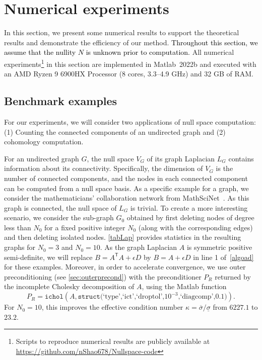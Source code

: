 \documentclass{siamart190516}
\newcommand{\Ttran}{\mathsf{T}}
\newcommand{\edit}[1]{\textcolor{black}{#1}} %
\begin{document}
\section{Numerical experiments}
\label{Sec:NumExp}



In this section, we present some numerical results to support the theoretical results and demonstrate the efficiency of our method. 
\edit{Throughout this section, we assume that the nullity $N$ is unknown prior to computation.}
All numerical experiments\footnote{Scripts to reproduce
numerical results are publicly available at \url{https://github.com/nShao678/Nullspace-code}} in this section are implemented in Matlab~2022b and executed with an AMD Ryzen 9 6900HX Processor (8 cores, 3.3--4.9 GHz) and 32 GB of RAM.
\subsection{Benchmark examples} \label{sec:benchmark}

For our experiments, we will consider two applications of null space computation: (1) Counting the connected components of an undirected graph and (2) cohomology computation.

For an undirected graph $G$, the null space $V_{G}$ of its graph Laplacian $L_{G}$ contains information about its connectivity. Specifically, the dimension of $V_{G}$ is the number of connected components, and the nodes in each connected component can be computed from a null space basis. As a specific example for a graph, we consider the mathematicians' collaboration network from MathSciNet~\cite{Rossi2015}. 
As this graph is connected, the null space of $L_{G}$ is trivial. 
To create a more interesting scenario, we consider the sub-graph $G_{0}$ obtained by first deleting nodes of degree less than $N_{0}$
for a fixed positive integer $N_{0}$ (along with the corresponding edges) and then deleting isolated nodes.
\cref{tabLap} provides statistics in the resulting graphs for $N_{0}=3$ and $N_{0}=10$. As the graph Laplacian $A$ is symmetric positive semi-definite, we will replace $B=A^{\Ttran}A+\epsilon D$ by $B=A+\epsilon D$ in line 1 of~\cref{algoad} for these examples. Moreover, in order to accelerate convergence, we use outer preconditioning (see \cref{sec:outerprecond}) with the preconditioner $P_R$ returned by the incomplete Cholesky decomposition of $A$, using the Matlab function 
\begin{equation}
    \label{defichol}
    P_R=\mathtt{ichol}(A, \mathtt{struct}\text{(`type',`ict',`droptol',$10^{-3}$,`diagcomp',$0.1$)}).
\end{equation}
For $N_{0}=10$, this improves the effective condition number $\kappa=\overline{\sigma}/\underline{\sigma}$ from $6227.1$ to $23.2$.
\end{document}
